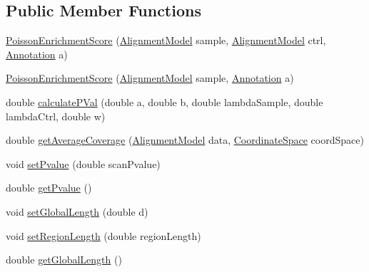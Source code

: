 \subsection*{Public Member Functions}
\begin{DoxyCompactItemize}
\item 
\hyperlink{classumms_1_1core_1_1model_1_1score_1_1_poisson_enrichment_score_a51283d47ccb7a2c89580dff633705532}{Poisson\+Enrichment\+Score} (\hyperlink{classumms_1_1core_1_1model_1_1_alignment_model}{Alignment\+Model} sample, \hyperlink{classumms_1_1core_1_1model_1_1_alignment_model}{Alignment\+Model} ctrl, \hyperlink{interfaceumms_1_1core_1_1annotation_1_1_annotation}{Annotation} a)
\item 
\hyperlink{classumms_1_1core_1_1model_1_1score_1_1_poisson_enrichment_score_a230f6f8524e7d59b72e698e2f5ec312d}{Poisson\+Enrichment\+Score} (\hyperlink{classumms_1_1core_1_1model_1_1_alignment_model}{Alignment\+Model} sample, \hyperlink{interfaceumms_1_1core_1_1annotation_1_1_annotation}{Annotation} a)
\item 
double \hyperlink{classumms_1_1core_1_1model_1_1score_1_1_poisson_enrichment_score_ae7e5653afa419e3870ebe81a5cdb36ab}{calculate\+P\+Val} (double a, double b, double lambda\+Sample, double lambda\+Ctrl, double w)
\item 
double \hyperlink{classumms_1_1core_1_1model_1_1score_1_1_poisson_enrichment_score_af7c1c57de963db1269ac73fdc35c6395}{get\+Average\+Coverage} (\hyperlink{classumms_1_1core_1_1model_1_1_alignment_model}{Alignment\+Model} data, \hyperlink{interfaceumms_1_1core_1_1coordinatesystem_1_1_coordinate_space}{Coordinate\+Space} coord\+Space)
\item 
void \hyperlink{classumms_1_1core_1_1model_1_1score_1_1_poisson_enrichment_score_a1b0f24ea796da0cd9de002440a4686cc}{set\+Pvalue} (double scan\+Pvalue)
\item 
double \hyperlink{classumms_1_1core_1_1model_1_1score_1_1_poisson_enrichment_score_a92527822d24cf2809729926cd4866935}{get\+Pvalue} ()
\item 
void \hyperlink{classumms_1_1core_1_1model_1_1score_1_1_poisson_enrichment_score_a81cf92cb99e356b366d22275dd65de60}{set\+Global\+Length} (double d)
\item 
void \hyperlink{classumms_1_1core_1_1model_1_1score_1_1_poisson_enrichment_score_a5eea269758261a12634b7412ca74f904}{set\+Region\+Length} (double region\+Length)
\item 
double \hyperlink{classumms_1_1core_1_1model_1_1score_1_1_poisson_enrichment_score_ab7942d7e9a951cec179a9f9d32a90dae}{get\+Global\+Length} ()

\end{DoxyCompactItemize}
